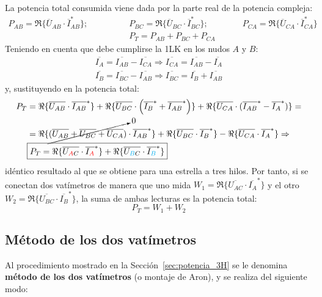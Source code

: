 	La potencia total consumida viene dada por la parte real de la potencia compleja: 
	\begin{align*}
	    P_{AB}=\Re\{\overline{U}_{AB} \cdot \overline{I}_{AB}^*\};\qquad \qquad
	    &P_{BC}=\Re\{\overline{U}_{BC} \cdot \overline{I}_{BC}^*\};\qquad \qquad
	    P_{CA}=\Re\{\overline{U}_{CA} \cdot \overline{I}_{CA}^*\}\\
	    &P_T=P_{AB}+P_{BC}+P_{CA}
	\end{align*}
	Teniendo en cuenta que debe cumplirse la 1LK en los nudos $A$ y $B$:
	\begin{align*}
	    \overline{I_A}=\overline{I_{AB}}-\overline{I_{CA}}\Rightarrow \overline{I_{CA}}=\overline{I_{AB}}-\overline{I_A}\\
	    \overline{I_B}=\overline{I_{BC}}-\overline{I_{AB}}\Rightarrow \overline{I_{BC}}=\overline{I_{B}}+\overline{I_{AB}}
	\end{align*}
	y, sustituyendo en la potencia total:
		\begin{align}
	    P_T&= \Re\{\overline{U_{AB}}\cdot \overline{I_{AB}}^*\} + \Re\{\overline{U_{BC}}\cdot\left(\overline{I_B}^*+\overline{I_{AB}}^* \right)\}  + \Re\{\overline{U_{CA}} \cdot (\overline{I_{AB}}^*-\overline{I_A}^*)\}=\nonumber \\
                  &= \Re\{\cancelto{0}{(\overline{U_{AB}}+\overline{U_{BC}}+\overline{U_{CA}})}\cdot \overline{I_{AB}}^*\}+\Re\{\overline{U_{BC}} \cdot \overline{I_B}^*\} - \Re\{\overline{U_{CA}} \cdot \overline{I_A}^*\}\Rightarrow \nonumber \\
                  &\boxed{P_T=\Re\{\overline{U_{\textcolor{red}{A}C}} \cdot \overline{I_{\textcolor{red}{A}}}^*\} + \Re\{\overline{U_{\textcolor{cyan}{B}C}} \cdot \overline{I_{\textcolor{cyan}{B}}}^*\}}
	\end{align}
	idéntico resultado al que se obtiene para una estrella a tres hilos. Por tanto, si se conectan dos vatímetros de manera que uno mida $W_1=\Re\{\overline{U_{AC}} \cdot \overline{I_A}^*\}$ y el otro $W_2=\Re\{\overline{U_{BC}} \cdot \overline{I_B}^*\}$, la suma de ambas lecturas es la potencia total: 
	\begin{equation*}
	    P_T=W_1+W_2
	\end{equation*}
	
	\subsection{Método de los dos vatímetros}\label{sec:dos_vat}
	
	Al procedimiento mostrado en la Sección~\ref{sec:potencia_3H} se le denomina \textbf{método de los dos vatímetros} (o montaje de Aron), y se realiza del siguiente modo: 
	
